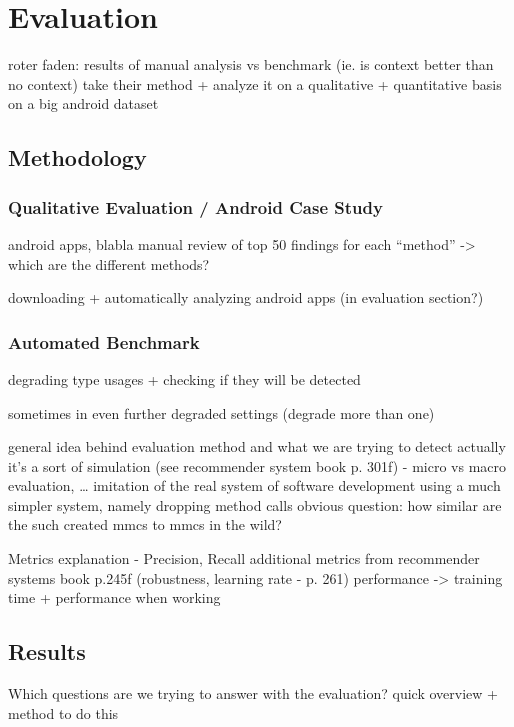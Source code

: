 \chapter{Evaluation}\label{ch:eval}
roter faden: results of manual analysis vs benchmark (ie. is context better than no context)
take their method + analyze it on a qualitative + quantitative basis on a big android dataset


\section{Methodology}

\subsection{Qualitative Evaluation / Android Case Study}
android apps, blabla
manual review of top 50 findings for each ``method''
-> which are the different methods?

downloading + automatically analyzing android apps (in evaluation section?)

\subsection{Automated Benchmark}
degrading type usages + checking if they will be detected

sometimes in even further degraded settings (degrade more than one)

general idea behind evaluation method and what we are trying to detect
actually it's a sort of simulation (see recommender system book p. 301f) - micro vs macro evaluation, \ldots
    imitation of the real system of software development
    using a much simpler system, namely dropping method calls
    obvious question: how similar are the such created mmcs to mmcs in the wild?

Metrics explanation - Precision, Recall
    additional metrics from recommender systems book p.245f (robustness, learning rate - p. 261)
    performance -> training time + performance when working

\section{Results}
Which questions are we trying to answer with the evaluation?
quick overview + method to do this

